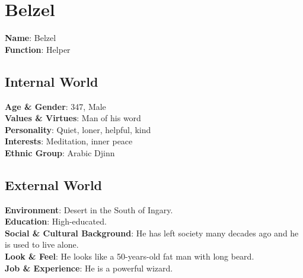 \section{Belzel}


\begin{minipage}{0.5\textwidth}
\textbf{Name}: Belzel \\
\textbf{Function}: Helper

\subsection{Internal World}

\textbf{Age \& Gender}: 347, Male \\
\textbf{Values \& Virtues}: Man of his word  \\
\textbf{Personality}: Quiet, loner, helpful, kind \\
\textbf{Interests}: Meditation, inner peace \\
\textbf{Ethnic Group}: Arabic Djinn
\subsection{External World}
\textbf{Environment}: Desert in the South of Ingary.  \\
\textbf{Education}: High-educated. \\
\textbf{Social \& Cultural Background}: He has left society many decades ago and he is used to live alone. \\
\textbf{Look \& Feel}: He looks like a 50-years-old fat man with long beard. \\
\textbf{Job \& Experience}: He is a powerful wizard. \\

\end{minipage}%
%
